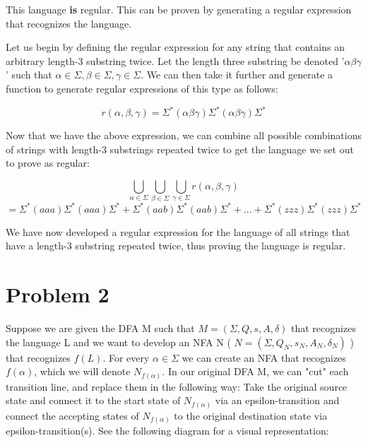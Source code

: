\documentclass[11pt, letterpaper]{article}
\begin{document}
\begin{enumerate}[label=\Alph*]
This language \textbf{is} regular. This can be proven by generating a regular expression that recognizes the language.

\quad Let us begin by defining the regular expression for any string that contains an arbitrary length-3 substring twice. Let the length three substring be denoted '$\alpha \beta \gamma$' such that $\alpha \in \Sigma, \beta \in \Sigma, \gamma \in \Sigma$. We can then take it further and generate a function to generate regular expressions of this type as follows:

$$ r(\alpha, \beta, \gamma) = \Sigma^*(\alpha \beta \gamma) \Sigma^* (\alpha \beta \gamma) \Sigma^* $$

\quad Now that we have the above expression, we can combine all possible combinations of strings with length-3 substrings repeated twice to get the language we set out to prove as regular:

$$ \bigcup_{\alpha \in \Sigma} \bigcup_{\beta \in \Sigma} \bigcup_{\gamma \in \Sigma} r(\alpha, \beta, \gamma) $$
$$ =\Sigma^*(aaa)\Sigma^*(aaa)\Sigma^* + \Sigma^*(aab)\Sigma^*(aab)\Sigma^* + ... + \Sigma^*(zzz)\Sigma^*(zzz)\Sigma^* $$

We have now developed a regular expression for the language of all strings that have a length-3 substring repeated twice, thus proving the language is regular.

\end{enumerate}

\pagebreak

\section*{Problem 2}

\quad Suppose we are given the DFA M such that $M = (\Sigma, Q, s, A, \delta)$ that recognizes the language L and we want to develop an NFA N ( $N = (\Sigma, Q_N, s_N, A_N, \delta_N)$ ) that recognizes $f(L)$. For every $\alpha \in \Sigma$ we can create an NFA that recognizes $f(\alpha)$, which we will denote $N_{f(\alpha)}$. In our original DFA M, we can "cut" each transition line, and replace them in the following way: Take the original source state and connect it to the start state of $N_{f(\alpha)}$ via an epsilon-transition and connect the accepting states of $N_{f(\alpha)}$ to the original destination state via epsilon-transition(s). See the following diagram for a visual representation:
\end{document}
